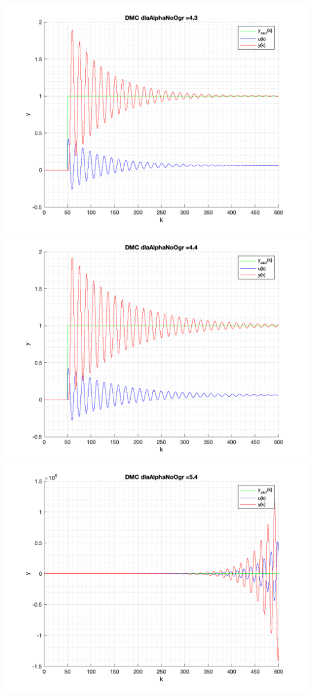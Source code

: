 \documentclass[a4paper, 11pt]{article}
\begin{document}
\begin{enumerate}
 \includegraphics[width=\linewidth]{./ModelsDodatkowe_AlphaNoOgr/P4_DMC_AlphaNoOgr_4_3_png.png} 
 \includegraphics[width=\linewidth]{./ModelsDodatkowe_AlphaNoOgr/P4_DMC_AlphaNoOgr_4_4_png.png} 
 \includegraphics[width=\linewidth]{./ModelsDodatkowe_AlphaNoOgr/P4_DMC_AlphaNoOgr_5_4_png.png} 

\end{enumerate}
\end{document}
